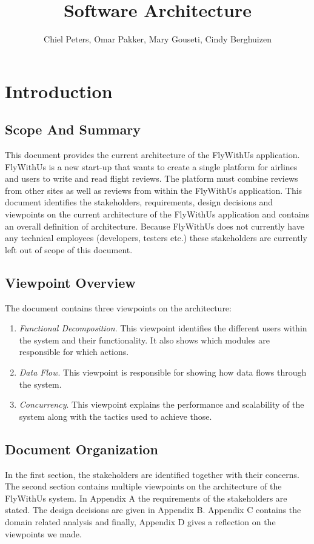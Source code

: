\documentclass{article}
\begin{document}
\title{Software Architecture}
\author{Chiel Peters, Omar Pakker, Mary Gouseti, Cindy Berghuizen}
\maketitle


\setlength\parindent{0pt}

\section{Introduction}
\subsection{Scope And Summary}
This document provides the current architecture of the FlyWithUs application. FlyWithUs is a new start-up that wants to create a single platform for airlines and users to write and read flight reviews. The platform must combine reviews from other sites as well as reviews from within the FlyWithUs application.
This document identifies the stakeholders, requirements, design decisions and viewpoints on the current architecture of the FlyWithUs application and contains an overall definition of architecture. Because FlyWithUs does not currently have any technical employees (developers, testers etc.) these stakeholders are currently left out of scope of this document.
 
\subsection{Viewpoint Overview}
The document contains three viewpoints on the architecture:
\begin{enumerate}
\item \emph{Functional Decomposition}. This viewpoint identifies the different users within the system and their functionality. It also shows which modules are responsible for which actions.
\item \emph{Data Flow}. This viewpoint is responsible for showing how data flows through the system.
\item \emph{Concurrency}. This viewpoint explains the performance and scalability of the system along with the tactics used to achieve those.
\end{enumerate}
 
\subsection{Document Organization}
In the first section, the stakeholders are identified together with their concerns.
The second section contains multiple viewpoints on the architecture of the FlyWithUs system. In Appendix A the requirements of the stakeholders are stated. The design decisions are given in Appendix B. Appendix C contains the domain related analysis and finally, Appendix D gives a reflection on the viewpoints we made. 
\end{document}
